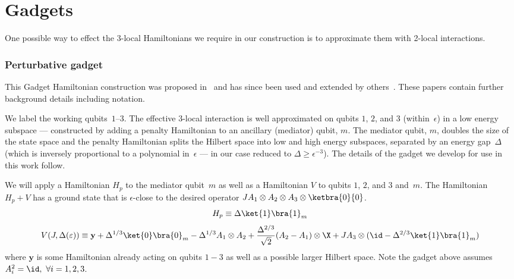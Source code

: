 \documentclass[11pt,oneside,final]{huthesis}%
\begin{document}




\section{Gadgets}
\label{sec:gadgets}
One possible way to effect the 3-local Hamiltonians we require in our
construction is to approximate them with 2-local interactions.

\subsubsection{Perturbative gadget}
This {Gadget Hamiltonian} construction was proposed in~\cite{Kempe06} and has since been used
and extended by others~\cite{Oliveira08,Biamonte08}.
These papers contain further background details including notation.

We label the working qubits~$1$--$3$.  The effective 3-local interaction
is well approximated on qubits $1$, $2$, and $3$ (within~$\epsilon$) in a
low energy subspace --- constructed by adding a penalty Hamiltonian to
an ancillary (mediator) qubit, $m$.  The mediator qubit, $m$, doubles the
size of the state space and the penalty Hamiltonian splits the Hilbert
space into low and high energy subspaces, separated by an energy
gap~$\Delta$ (which is inversely proportional to a polynomial in~$\epsilon$
--- in our case reduced to $\Delta \geq \epsilon^{-3}$).
The details of the gadget we develop for use in this work follow. 

We will apply a Hamiltonian $H_p$ to the mediator qubit~$m$ as well as a
Hamiltonian $V$ to qubits $1$, $2$, and $3$ and~$m$.  The Hamiltonian~$H_p + V$
has a ground state that is $\epsilon$-close to the desired operator
$JA_1\otimes A_2 \otimes A_3 \otimes \ketbra{0}{0}$.
\begin{equation}
H_p \equiv \Delta \ket{1}\bra{1}_m 
\end{equation} 
\begin{equation} 
V(J,\Delta(\varepsilon)) \equiv \textbf{y} + \Delta^{1/3}\ket{0}\bra{0}_m - \Delta^{1/3}A_1\otimes A_2 + \frac{\Delta^{2/3}}{\sqrt{2}}(A_2-A_1)\otimes\X 
+ JA_3\otimes(\id-\Delta^{2/3}\ket{1}\bra{1}_m)
\end{equation} 
where $\textbf{y}$ is some Hamiltonian already acting on qubits $1-3$ as well as a
possible larger Hilbert space.  Note the gadget above assumes $A_i^2=\id,~\forall i=1,2,3$. 
\end{document}
